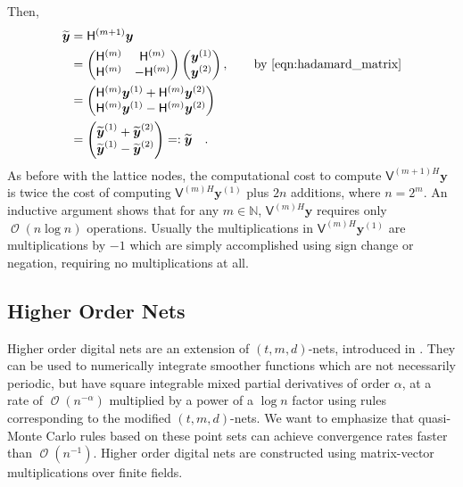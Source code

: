 \documentclass[graybox,footinfo]{svmult}
\DeclareMathOperator{\Order}{{\mathcal O}}
\newcommand{\bm}[1]{\boldsymbol{#1}}
\newcommand{\naturals}{\mathbb{N}}
\newcommand{\vy}{\bm{y}}
\newcommand{\mH}{\mathsf{H}}
\newcommand{\mV}{\mathsf{V}}
\begin{document}
Then,
\begin{align*}
\widetilde{\vy} &= \mH^{({m+1})} {\vy} \\
& = \begin{pmatrix}
\mH^{(m)} & \mH^{(m)} \\ \mH^{(m)} & - \mH^{(m)}
\end{pmatrix} 
\begin{pmatrix}
\vy^{(1)} \\ \vy^{(2)}
\end{pmatrix}, \qquad \text{by \eqref{eqn:hadamard_matrix}} \\
&= 
\begin{pmatrix}
\mH^{(m)} \vy^{(1)} + \mH^{(m)} \vy^{(2)} \\ 
\mH^{(m)} \vy^{(1)} - \mH^{(m)} \vy^{(2)}
\end{pmatrix}\\
&= 
\begin{pmatrix}
\widetilde{\vy}^{(1)} + \widetilde {\vy}^{(2)} \\ 
\widetilde {\vy}^{(1)} - \widetilde {\vy}^{(2)}
\end{pmatrix} =: \widetilde{\vy} \quad.
\end{align*}
As before with the lattice nodes, the computational cost to compute $\mV^{(m+1)H} \vy$ is 
twice the cost of computing $\mV^{(m)H} \vy^{(1)}$ plus $2n$ additions, where $n=2^m$. An inductive argument shows that for any $m \in \naturals$, $\mV^{(m)H}\vy$ requires only $\Order(n \log n)$ operations. Usually the multiplications in $\mV^{(m)H} \vy^{(1)}$ are multiplications by $-1$ which are simply accomplished using sign change or negation, requiring no multiplications at all.


\subsection{Higher Order Nets}

Higher order digital nets are an extension of $(t,m,d)$-nets, introduced in \cite{Dic08a}. They can be used to numerically integrate smoother functions which are not necessarily periodic, but have square integrable mixed partial derivatives of order $\alpha$, at a rate of $\Order(n^{-\alpha})$ multiplied by a power of a $\log n$ factor using rules corresponding to the modified $(t,m, d)$-nets.
We want to emphasize that quasi-Monte Carlo rules based on these point sets can achieve convergence rates faster than $\Order(n^{-1})$. 
Higher order digital nets are constructed using matrix-vector multiplications over finite
fields. 
\end{document}

